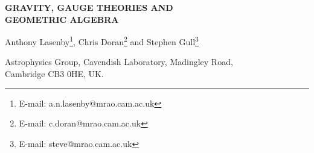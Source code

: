 \documentclass[a4paper]{article}
\numberwithin{equation}{section}
\begin{document}

\thispagestyle{empty}

\vspace*{0.4cm}

\noindent
\textsf{\textbf{\large GRAVITY, GAUGE THEORIES AND \\ GEOMETRIC ALGEBRA}}

\vspace{0.4 cm}

\noindent
{\large Anthony Lasenby\footnote{E-mail: a.n.lasenby@mrao.cam.ac.uk},
Chris Doran\footnote{E-mail: c.doran@mrao.cam.ac.uk} and Stephen
Gull\footnote{E-mail: steve@mrao.cam.ac.uk}}

\vspace{0.4cm}
\noindent
Astrophysics Group, Cavendish Laboratory, Madingley Road, \\
Cambridge CB3 0HE, UK.

\vspace{0.4cm}
\end{document}
